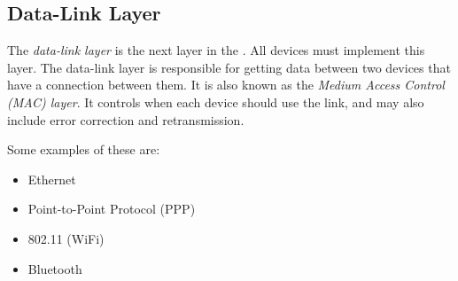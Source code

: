 \subsection{Data-Link Layer}\label{subsec:Data_Link_Layer}
\begin{definition}\label{def:Data_Link_Layer}
  The \emph{data-link layer} is the next layer in the .
  All devices must implement this layer.
  The data-link layer is responsible for getting data between two devices that have a  connection between them.
  It is also known as the \emph{Medium Access Control (MAC) layer}.
  It controls when each device should use the link, and may also include error correction and retransmission.

  Some examples of these are:
  \begin{itemize}[noitemsep]
  \item Ethernet
  \item Point-to-Point Protocol (PPP)
  \item 802.11 (WiFi)
  \item Bluetooth
  \end{itemize}
\end{definition}

